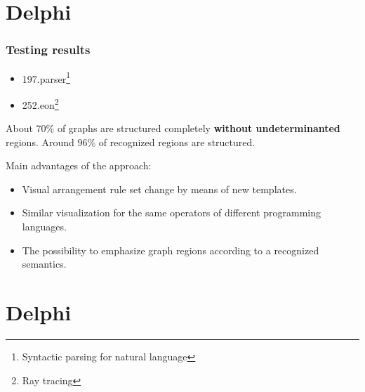 \documentclass{beamer}
\begin{document}
\begin{frame}
\begin{figure}[htbp]
\begin{minipage}[b]{0.49\linewidth}
	\end{minipage}
\end{figure}
\end{frame}


\section{Delphi}
\begin{frame}
\frametitle{Testing results}
\begin{itemize}
	\item 197.parser\footnote{Syntactic parsing for natural language}
	\item 252.eon\footnote{Ray tracing}
\end{itemize}

About 70\% of graphs are structured completely \textbf{without undeterminanted} regions.  Around 96\% of recognized regions are structured.

Main advantages of the approach:
\begin{itemize}
	\item Visual arrangement rule set change by means of new templates.
	\item Similar visualization for the same operators of different programming languages.
	\item The possibility to emphasize graph regions according to a recognized semantics.
\end{itemize}

\end{frame}

\section{Delphi}
\maketitle
\end{document}
